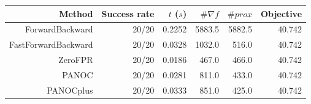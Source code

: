\begin{tabular}{rrrrrr}
  \toprule
  \textbf{Method} & \textbf{Success rate} & \textbf{$t$ ($s$)} & \textbf{$\#\nabla f$} & \textbf{$\#prox$} & \textbf{Objective} \\
  \midrule
  ForwardBackward & 20/20 & 0.2252 & 5883.5 & 5882.5 & 40.742 \\
  FastForwardBackward & 20/20 & 0.0328 & 1032.0 & 516.0 & 40.742 \\
  ZeroFPR & 20/20 & 0.0186 & 467.0 & 466.0 & 40.742 \\
  PANOC & 20/20 & 0.0281 & 811.0 & 433.0 & 40.742 \\
  PANOCplus & 20/20 & 0.0333 & 851.0 & 425.0 & 40.742 \\
  \bottomrule
\end{tabular}
